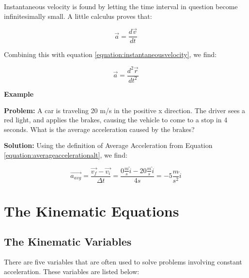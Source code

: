 Instantaneous velocity is found by letting the time interval in question become infinitesimally small.  A little calculus proves that:
\begin{mdframed}[backgroundcolor=orange!20!white]
	\begin{equation}
	\vec{a} = \frac{d \vec{v}}{dt} 
	\end{equation}
\end{mdframed}

Combining this with equation \ref{equation:instantaneousvelocity}, we find:
\begin{mdframed}[backgroundcolor=orange!20!white]
	\begin{equation}
	\vec{a} = \frac{d^2 \vec{r}}{dt^2} 
	\end{equation}
\end{mdframed}


\begin{mdframed}[backgroundcolor=blue!10!white]
	\begin{center}
		
		
		\textbf{Example \thesection}	
	\end{center}
	\vspace{0.1in}
	
	\textbf{Problem: } A car is traveling 20 m/s in the positive x direction.  The driver sees a red light, and applies the brakes, causing the vehicle to come to a stop in 4 seconds.  What is the average acceleration caused by the brakes?
	
	\vspace{0.1in}
	
	\textbf{Solution:} Using the definition of Average Acceleration from Equation \ref{equation:averageaccelerationalt}, we find:
	
	\begin{equation*}
			\overrightarrow{a_{avg}} = \frac{\overrightarrow{v_f} - \overrightarrow {v_i}}{\Delta t} = \frac{0 \frac{m}{s} \hat{i} - 20 \frac{m}{s} \hat{i}}{4 s}   = -5 \frac{m}{s^2} \hat{i}
	\end{equation*}
\end{mdframed}

\section{The Kinematic Equations} 
\subsection{The Kinematic Variables} 
There are five variables that are often used to solve problems involving constant acceleration.  These variables are listed below:

